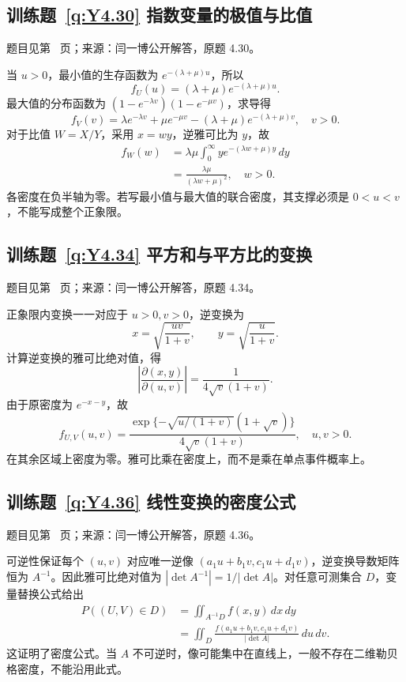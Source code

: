 \documentclass[UTF8,12pt,a4paper,fontset=fandol]{ctexbook}
\begin{document}
\subsection*{训练题~\ref{q:Y4.30} 指数变量的极值与比值}\label{a:Y4.30}{\small 题目见第~\pageref{q:Y4.30} 页；来源：闫一博公开解答，原题 4.30。}
\begin{solve}当 $u>0$，最小值的生存函数为 $e^{-(\lambda+\mu)u}$，所以\[f_U(u)=(\lambda+\mu)e^{-(\lambda+\mu)u}.\]最大值的分布函数为 $(1-e^{-\lambda v})(1-e^{-\mu v})$，求导得\[f_V(v)=\lambda e^{-\lambda v}+\mu e^{-\mu v}-(\lambda+\mu)e^{-(\lambda+\mu)v},\quad v>0.\]对于比值 $W=X/Y$，采用 $x=wy$，逆雅可比为 $y$，故\[\begin{aligned}f_W(w)&=\lambda\mu\int_0^\infty ye^{-(\lambda w+\mu)y}\,dy\\&=\frac{\lambda\mu}{(\lambda w+\mu)^2},\quad w>0.\end{aligned}\]各密度在负半轴为零。若写最小值与最大值的联合密度，其支撑必须是 $0<u<v$，不能写成整个正象限。\end{solve}

\subsection*{训练题~\ref{q:Y4.34} 平方和与平方比的变换}\label{a:Y4.34}{\small 题目见第~\pageref{q:Y4.34} 页；来源：闫一博公开解答，原题 4.34。}
\begin{solve}正象限内变换一一对应于 $u>0,v>0$，逆变换为\[x=\sqrt{\frac{uv}{1+v}},\qquad y=\sqrt{\frac{u}{1+v}}.\]计算逆变换的雅可比绝对值，得\[\left|\frac{\partial(x,y)}{\partial(u,v)}\right|=\frac{1}{4\sqrt v(1+v)}.\]由于原密度为 $e^{-x-y}$，故\[f_{U,V}(u,v)=\frac{\exp\{-\sqrt{u/(1+v)}(1+\sqrt v)\}}{4\sqrt v(1+v)},\quad u,v>0.\]在其余区域上密度为零。雅可比乘在密度上，而不是乘在单点事件概率上。\end{solve}

\subsection*{训练题~\ref{q:Y4.36} 线性变换的密度公式}\label{a:Y4.36}{\small 题目见第~\pageref{q:Y4.36} 页；来源：闫一博公开解答，原题 4.36。}
\begin{solve}可逆性保证每个 $(u,v)$ 对应唯一逆像 $(a_1u+b_1v,c_1u+d_1v)$，逆变换导数矩阵恒为 $A^{-1}$。因此雅可比绝对值为 $|\det A^{-1}|=1/|\det A|$。对任意可测集合 $D$，变量替换公式给出\[\begin{aligned}P((U,V)\in D)&=\iint_{A^{-1}D}f(x,y)\,dx\,dy\\&=\iint_D\frac{f(a_1u+b_1v,c_1u+d_1v)}{|\det A|}\,du\,dv.\end{aligned}\]这证明了密度公式。当 $A$ 不可逆时，像可能集中在直线上，一般不存在二维勒贝格密度，不能沿用此式。\end{solve}
\end{document}
